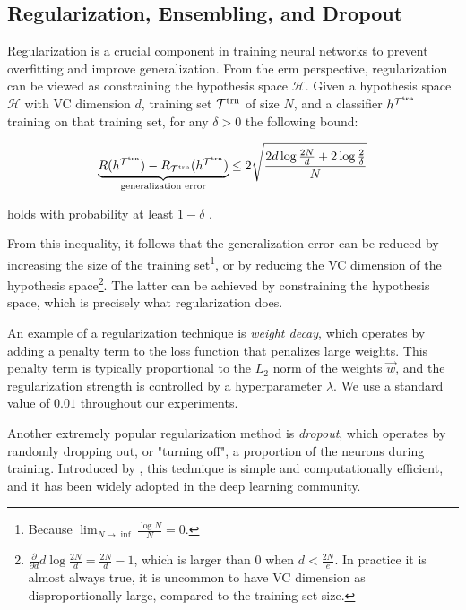 \subsection{Regularization, Ensembling, and Dropout}
\label{sec:dropout}

Regularization is a crucial component in training neural networks to prevent overfitting and improve generalization.
From the \gls{erm} perspective, regularization can be viewed as constraining the hypothesis space $\mathcal{H}$.
Given a hypothesis space $\mathcal{H}$ with VC dimension $d$, training set ${\mathcal{T}^\text{trn}}$ of size $N$, and a classifier
$h^{\mathcal{T}^\text{trn}}$ training on that training set, for any $\delta > 0$ the following bound:

\begin{equation}
    \label{eq:generalization}
    \underbrace{R(h^{\mathcal{T}^\text{trn}}) - R_{\mathcal{T}^\text{trn}}(h^{\mathcal{T}^\text{trn}})}_\text{generalization error}
    \leq 2\sqrt{\frac{2 d \log \frac{2N}{d} + 2 \log \frac{2}{\delta}}{N}}
\end{equation}

holds with probability at least $1 - \delta$ \cite{generalization-bound}.

From this inequality, it follows that the generalization error can be reduced by increasing the size of the training
set\footnote{\vspace{5pt}Because $\lim_{N \rightarrow \inf}\frac{\log N}{N} = 0$.}, or by reducing the VC dimension of the
hypothesis space\footnote{$\frac{\partial}{\partial d} d \log \frac{2N}{d} = \frac{2N}{d} - 1$, which is larger than 0
    when $d < \frac{2N}{e}$. In practice it is almost always true, it is uncommon to have VC dimension as
    disproportionally large, compared to the training set size.}. The latter can be achieved by constraining the
hypothesis space, which is precisely what regularization does.

An example of a regularization technique is \emph{weight decay}, which operates by adding a penalty term to the loss
function that penalizes large weights. This penalty term is typically proportional to the $L_2$ norm of the weights
$\vec{w}$, and the regularization strength is controlled by a hyperparameter $\lambda$. We use a standard value of
$0.01$ throughout our experiments.

Another extremely popular regularization method is \emph{dropout}, which operates by randomly dropping out, or "turning
off", a proportion of the neurons during training. Introduced by \cite{dropout}, this technique is simple and
computationally efficient, and it has been widely adopted in the deep learning community.

